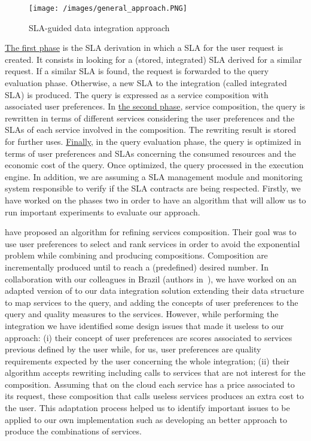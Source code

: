 \begin{figure}[h!]
\center
\texttt{[image: /images/general\_approach.PNG]} 
\caption{SLA-guided data integration approach}
\end{figure}

\underline{The first phase} is the SLA derivation in which a SLA for the user request is created. It consists in looking for a (stored, integrated) SLA derived for a similar request. If a similar SLA is found, the request is forwarded to the query evaluation phase. Otherwise, a new SLA to the integration (called integrated SLA) is produced. The query is expressed as a service composition with associated user preferences. In \underline{the second phase}, service composition, the query is rewritten in terms of different services considering the user preferences and the SLAs of each service involved in the composition. The rewriting result is stored for further uses. \underline{Finally}, in the query evaluation phase, the query is optimized in terms of user preferences and SLAs concerning the consumed resources and the economic cost of the query. Once optimized, the query processed in the execution engine. In addition, we are assuming a SLA management module and monitoring system responsible to verify if the SLA contracts are being respected. Firstly, we have worked on the phases two in order to have an algorithm that will allow us to run important experiments to evaluate our approach. 
	
\cite{ba2014} have proposed an algorithm for refining services composition. Their goal was to use user preferences to select and rank services in order to avoid the exponential problem while combining and producing compositions. Composition are incrementally produced until to reach a (predefined) desired number. In collaboration with our colleagues in Brazil (authors in~\cite{ba2014}), we have worked on an adapted version of \cite{ba2014} to our data integration solution extending their data structure to map services to the query, and adding the concepts of user preferences to the query and quality measures to the services. However, while performing the integration we have identified some design issues that made it useless to our approach: (i) their concept of user preferences are scores associated to services previous defined by the user while, for us, user preferences are quality requirements expected by the user concerning the whole integration; (ii) their algorithm accepts rewriting including calls to services that are not interest for the composition. Assuming that on the cloud each service has a price associated to its request, these composition that calls useless services produces an extra cost to the user. This adaptation process helped us to identify important issues to be applied to our own implementation such as developing an better approach to produce the combinations of services.

